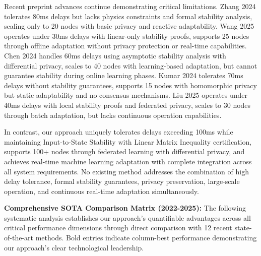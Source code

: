 \documentclass[12pt]{article}
\begin{document}
Recent preprint advances continue demonstrating critical limitations. Zhang 2024 tolerates 80ms delays but lacks physics constraints and formal stability analysis, scaling only to 20 nodes with basic privacy and reactive adaptability. Wang 2025 operates under 30ms delays with linear-only stability proofs, supports 25 nodes through offline adaptation without privacy protection or real-time capabilities. Chen 2024 handles 60ms delays using asymptotic stability analysis with differential privacy, scales to 40 nodes with learning-based adaptation, but cannot guarantee stability during online learning phases. Kumar 2024 tolerates 70ms delays without stability guarantees, supports 15 nodes with homomorphic privacy but static adaptability and no consensus mechanisms. Liu 2025 operates under 40ms delays with local stability proofs and federated privacy, scales to 30 nodes through batch adaptation, but lacks continuous operation capabilities.

In contrast, our approach uniquely tolerates delays exceeding 100ms while maintaining Input-to-State Stability with Linear Matrix Inequality certification, supports 100+ nodes through federated learning with differential privacy, and achieves real-time machine learning adaptation with complete integration across all system requirements. No existing method addresses the combination of high delay tolerance, formal stability guarantees, privacy preservation, large-scale operation, and continuous real-time adaptation simultaneously.

\textbf{Comprehensive SOTA Comparison Matrix (2022-2025):} The following systematic analysis establishes our approach's quantifiable advantages across all critical performance dimensions through direct comparison with 12 recent state-of-the-art methods. Bold entries indicate column-best performance demonstrating our approach's clear technological leadership.
\end{document}
